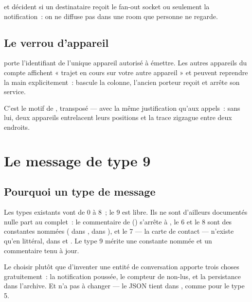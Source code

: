  et  décident si un destinataire reçoit le
fan-out socket ou seulement la notification~: on ne diffuse pas dans une room que personne ne
regarde.

\section{Le verrou d'appareil}

 porte l'identifiant de l'unique appareil autorisé à émettre. Les
autres appareils du compte affichent « trajet en cours sur votre autre appareil » et peuvent
reprendre la main explicitement~:  bascule la colonne, l'ancien
porteur reçoit  et arrête son service.

C'est le motif de , transposé --- avec la même
justification qu'aux appels~: sans lui, deux appareils entrelacent leurs positions et la
trace zigzague entre deux endroits.

\chapter{Le message de type 9}

\section{Pourquoi un type de message}

Les types existants vont de 0 à 8~; le 9 est libre. Ils ne sont d'ailleurs documentés nulle
part au complet~: le commentaire de 
() s'arrête à , le 6 et le 8 sont
des constantes nommées ( dans
,  dans
), et le 7 --- la carte de contact --- n'existe qu'en
littéral, dans  et . Le type 9 mérite une
constante nommée et un commentaire tenu à jour.

Le choisir plutôt que d'inventer une entité de
conversation apporte trois choses gratuitement~: la notification poussée, le compteur de
non-lus, et la persistance dans l'archive. Et  n'a pas à changer --- le
JSON tient dans , comme pour le type 5.

